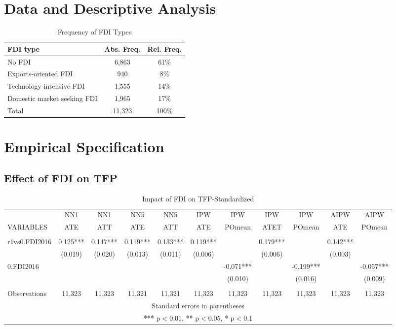\documentclass[a4paper,11pt]{scrartcl}
\begin{document}
\section{Data and Descriptive Analysis}
\begin{table}

  \centering
   \caption{Frequency of FDI Types} 

\begin{tabular}{lcc} \hline
 FDI type&Abs. Freq.&Rel. Freq. \\
\hline
No FDI&6,863 & 61\% \\
Exports-oriented FDI&940 & 8\%\\
Technology intensive FDI & 1,555 & 14\% \\
Domestic market seeking FDI & 1,965 & 17\% \\
Total & 11,323 & 100\% \\
\end{tabular}
\end{table}


\section{Empirical Specification}

\subsection{Effect of FDI on TFP}

\begin{table}[htbp]\centering
\caption{Impact of FDI on TFP-Standardized}
\tiny
\begin{tabular}{lcccccccccc} \hline
 & NN1 & NN1 & NN5 & NN5 & IPW & IPW & IPW & IPW & AIPW & AIPW \\
VARIABLES & ATE & ATT & ATE& ATT & ATE & POmean & ATET & POmean & ATE & POmean \\ \hline
 &  &  &  &  &  &  &  &  &  &  \\
r1vs0.FDI2016 & 0.125*** & 0.147*** & 0.119*** & 0.133*** & 0.119*** &  & 0.179*** &  & 0.142*** &  \\
 & (0.019) & (0.020) & (0.013) & (0.011) & (0.006) &  & (0.006) &  & (0.003) &  \\
0.FDI2016 &  &  &  &  &  & -0.071*** &  & -0.199*** &  & -0.057*** \\
 &  &  &  &  &  & (0.010) &  & (0.016) &  & (0.009) \\
 &  &  &  &  &  &  &  &  &  &  \\
 Observations & 11,323 & 11,323 & 11,321 & 11,321 & 11,323 & 11,323 & 11,323 & 11,323 & 11,323 & 11,323 \\ \hline
\multicolumn{11}{c}{ Standard errors in parentheses} \\
\multicolumn{11}{c}{ *** p$<$0.01, ** p$<$0.05, * p$<$0.1} \\
\end{tabular}
\end{table}
 
\end{document}
